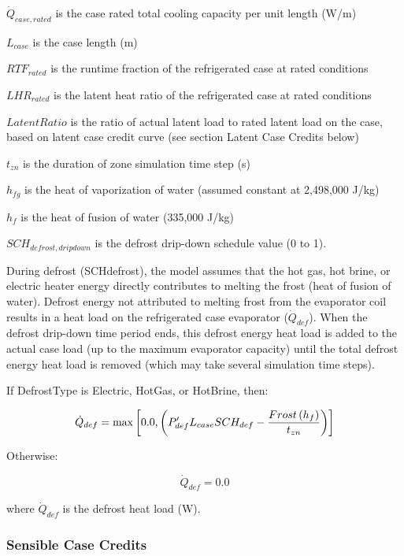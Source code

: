 \({\dot Q_{case,rated}}\) is the case rated total cooling capacity per unit length (W/m)

\({L_{case}}\) is the case length (m)

\(RT{F_{rated}}\) is the runtime fraction of the refrigerated case at rated conditions

\(LH{R_{rated}}\) is the latent heat ratio of the refrigerated case at rated conditions

\(LatentRatio\) is the ratio of actual latent load to rated latent load on the case, based on latent case credit curve (see section Latent Case Credits below)

\({t_{zn}}\) is the duration of zone simulation time step (s)

\({h_{fg}}\) is the heat of vaporization of water (assumed constant at 2,498,000 J/kg)

\({h_f}\) is the heat of fusion of water (335,000 J/kg)

\(SC{H_{defrost,dripdown}}\) is the defrost drip-down schedule value (0 to 1).

During defrost (SCHdefrost), the model assumes that the hot gas, hot brine, or electric heater energy directly contributes to melting the frost (heat of fusion of water). Defrost energy not attributed to melting frost from the evaporator coil results in a heat load on the refrigerated case evaporator (\({\dot{Q}_{def}}\)). When the defrost drip-down time period ends, this defrost energy heat load is added to the actual case load (up to the maximum evaporator capacity) until the total defrost energy heat load is removed (which may take several simulation time steps).

If DefrostType is Electric, HotGas, or HotBrine, then:

\begin{equation}
  \dot{Q}_{def} = \max\left[0.0,\left(P_{def}' L_{case} SCH_{def} - \frac{Frost\left(h_f\right)}{t_{zn}}\right)\right]
\end{equation}

Otherwise:

\begin{equation}  
  \dot{Q}_{def} = 0.0
\end{equation}

where \({\dot Q_{def}}\) is the defrost heat load (W).

\subsubsection{Sensible Case Credits}\label{sensible-case-credits}


